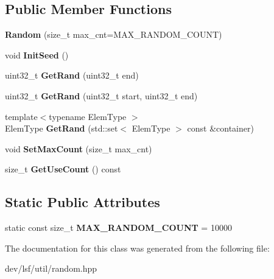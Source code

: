 \subsection*{Public Member Functions}
\begin{DoxyCompactItemize}
\item 
\hypertarget{classlsf_1_1util_1_1Random_a33be8723e4bcf792d8a0d4f1996a9c01}{
{\bfseries Random} (size\_\-t max\_\-cnt=MAX\_\-RANDOM\_\-COUNT)}
\label{classlsf_1_1util_1_1Random_a33be8723e4bcf792d8a0d4f1996a9c01}

\item 
\hypertarget{classlsf_1_1util_1_1Random_ab19d4154ceb6ab4c7b65c5774ff9b946}{
void {\bfseries InitSeed} ()}
\label{classlsf_1_1util_1_1Random_ab19d4154ceb6ab4c7b65c5774ff9b946}

\item 
\hypertarget{classlsf_1_1util_1_1Random_a29bc664ff73924cc28029e5870d4bc71}{
uint32\_\-t {\bfseries GetRand} (uint32\_\-t end)}
\label{classlsf_1_1util_1_1Random_a29bc664ff73924cc28029e5870d4bc71}

\item 
\hypertarget{classlsf_1_1util_1_1Random_a34c39a5d54f88e9b5b23d7649ac9772c}{
uint32\_\-t {\bfseries GetRand} (uint32\_\-t start, uint32\_\-t end)}
\label{classlsf_1_1util_1_1Random_a34c39a5d54f88e9b5b23d7649ac9772c}

\item 
\hypertarget{classlsf_1_1util_1_1Random_a5dd53e21b246aaefc7e404884bc4e3f7}{
{\footnotesize template$<$typename ElemType $>$ }\\ElemType {\bfseries GetRand} (std::set$<$ ElemType $>$ const \&container)}
\label{classlsf_1_1util_1_1Random_a5dd53e21b246aaefc7e404884bc4e3f7}

\item 
\hypertarget{classlsf_1_1util_1_1Random_afaa9705314a753c6995507ff38c56059}{
void {\bfseries SetMaxCount} (size\_\-t max\_\-cnt)}
\label{classlsf_1_1util_1_1Random_afaa9705314a753c6995507ff38c56059}

\item 
\hypertarget{classlsf_1_1util_1_1Random_a87f7b9f8c177cbfc0254ee7525829fec}{
size\_\-t {\bfseries GetUseCount} () const }
\label{classlsf_1_1util_1_1Random_a87f7b9f8c177cbfc0254ee7525829fec}

\end{DoxyCompactItemize}
\subsection*{Static Public Attributes}
\begin{DoxyCompactItemize}
\item 
\hypertarget{classlsf_1_1util_1_1Random_afc8046468a1e0ab07760875f8865bce4}{
static const size\_\-t {\bfseries MAX\_\-RANDOM\_\-COUNT} = 10000}
\label{classlsf_1_1util_1_1Random_afc8046468a1e0ab07760875f8865bce4}

\end{DoxyCompactItemize}


The documentation for this class was generated from the following file:\begin{DoxyCompactItemize}
\item 
dev/lsf/util/random.hpp\end{DoxyCompactItemize}
